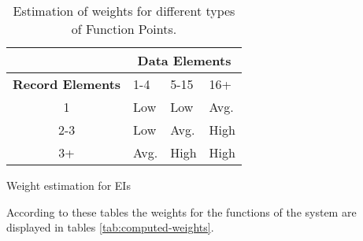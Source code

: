 \begin{table}[h]
\begin{subtable}{\textwidth}
    \centering
    \begin{tabular}{| c | l | l | l |}
        \hline
         & \multicolumn{3}{c|}{\textbf{Data Elements}} \\
        \hline
        \textbf{Record Elements} & 1-4 & 5-15 & 16+ \\
        \hline
        1       & Low     & Low     & Avg.     \\
        2-3     & Low     & Avg.    & High     \\
        3+      & Avg.    & High    & High     \\
        \hline
    \end{tabular}
    \caption{Weight estimation for EIs}
\end{subtable}
\caption{Estimation of weights for different types of Function Points.}
\label{tab:weight-estimation}
\end{table}


According to these tables the weights for the functions of the system are displayed in tables \autoref{tab:computed-weights}.

